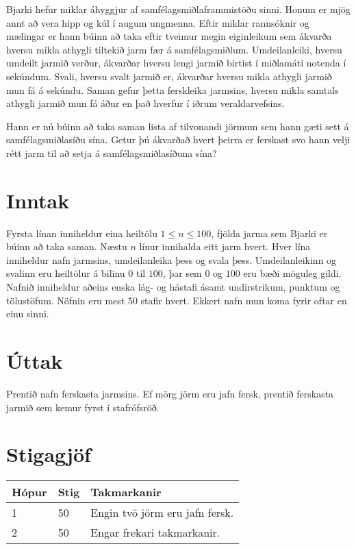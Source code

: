 
Bjarki hefur miklar áhyggjur af samfélagsmiðlaframmistöðu sinni. Honum er mjög annt að vera hipp og kúl í augum ungmenna.
Eftir miklar rannsóknir og mælingar er hann búinn að taka eftir tveimur megin eiginleikum sem ákvarða hversu mikla athygli tiltekið
jarm fær á samfélagsmiðlum. Umdeilanleiki, hversu umdeilt jarmið verður, ákvarðar hversu lengi jarmið birtist í miðlamáti notenda í sekúndum.
Svali, hversu svalt jarmið er, ákvarðar hversu mikla athygli jarmið mun fá á sekúndu. Saman gefur þetta ferskleika jarmsins, hversu
mikla samtals athygli jarmið mun fá áður en það hverfur í iðrum veraldarvefsins.

Hann er nú búinn að taka saman lista af tilvonandi jörmum sem hann gæti sett á samfélagsmiðlasíðu sína. Getur þú ákvarðað hvert þeirra
er ferskast svo hann velji rétt jarm til að setja á samfélagsmiðlasíðuna sína?

\section*{Inntak}
Fyrsta línan inniheldur eina heiltölu $1 \leq n \leq 100$, fjölda jarma sem Bjarki er búinn að taka saman.
Næstu $n$ línur innihalda eitt jarm hvert. Hver lína inniheldur nafn jarmsins, umdeilanleika þess og svala þess. Umdeilanleikinn og svalinn
eru heiltölur á bilinu $0$ til $100$, þar sem $0$ og $100$ eru bæði möguleg gildi. Nafnið inniheldur aðeins enska lág- og hástafi ásamt undirstrikum, punktum og tölustöfum. Nöfnin eru mest
$50$ stafir hvert. Ekkert nafn mun koma fyrir oftar en einu sinni.

\section*{Úttak}
Prentið nafn ferskasta jarmsins. Ef mörg jörm eru jafn fersk, prentið ferskasta jarmið sem kemur fyrst í stafrófsröð.

\section*{Stigagjöf}
\begin{tabular}{|l|l|l|}
\hline
Hópur & Stig & Takmarkanir \\ \hline
1     & 50   & Engin tvö jörm eru jafn fersk. \\ \hline
2     & 50   & Engar frekari takmarkanir. \\ \hline
\end{tabular}
